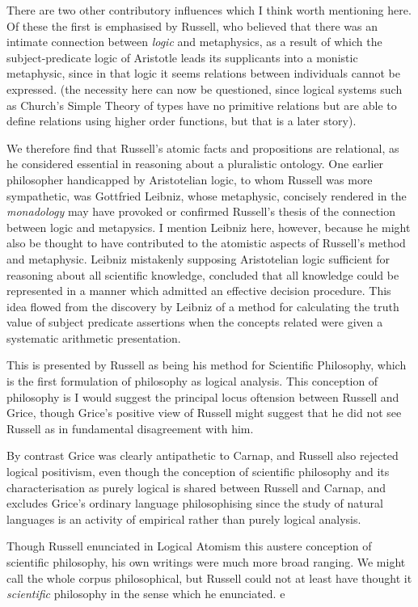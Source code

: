 \documentclass[10pt,titlepage]{article}
\begin{document}
There are two other contributory influences which I think worth mentioning here.
Of these the first is emphasised by Russell, who believed that there was an intimate connection between {\it logic} and
 metaphysics, as a result of which the subject-predicate logic of Aristotle leads its supplicants into a monistic metaphysic, since in that logic it seems relations between individuals cannot be expressed.
(the necessity here can now be questioned, since logical systems such as Church's Simple Theory of types have no primitive relations but are able to define relations using higher order functions, but that is a later story).

We therefore find that Russell's atomic facts and propositions are relational, as he considered essential in reasoning about a pluralistic ontology.
One earlier philosopher handicapped by Aristotelian logic, to whom Russell was more sympathetic, was Gottfried Leibniz, whose metaphysic, concisely rendered in the {\it monadology} may have provoked or confirmed Russell's thesis of the connection between logic and metapysics.
I mention Leibniz here, however, because he might also be thought to have contributed to the atomistic aspects of Russell's method and metaphysic.
Leibniz mistakenly supposing Aristotelian logic sufficient for reasoning about all scientific knowledge, concluded that all knowledge could be represented in a manner which admitted an effective decision procedure.
This idea flowed from the discovery by Leibniz of a method for calculating the truth value of subject predicate assertions when the concepts related were given a systematic arithmetic presentation.




This is presented by Russell as being his method for Scientific Philosophy,
which is the first formulation of philosophy as logical analysis.
This conception of philosophy is I would suggest the principal locus oftension between Russell and Grice, though Grice's positive view of Russell
might suggest that he did not see Russell as in fundamental disagreement with him.

By contrast Grice was clearly antipathetic to Carnap, and Russell also rejected logical positivism, even though the conception of scientific philosophy and its characterisation as purely logical is shared between Russell and Carnap, and excludes Grice's ordinary language philosophising since the study of natural languages is an activity of empirical rather than purely logical analysis.

Though Russell enunciated in Logical Atomism this austere conception of scientific philosophy, his own writings were much more broad ranging.
We might call the whole corpus philosophical, but Russell could not at least have thought it {\it scientific} philosophy in the sense which he enunciated.
e
\end{document}
